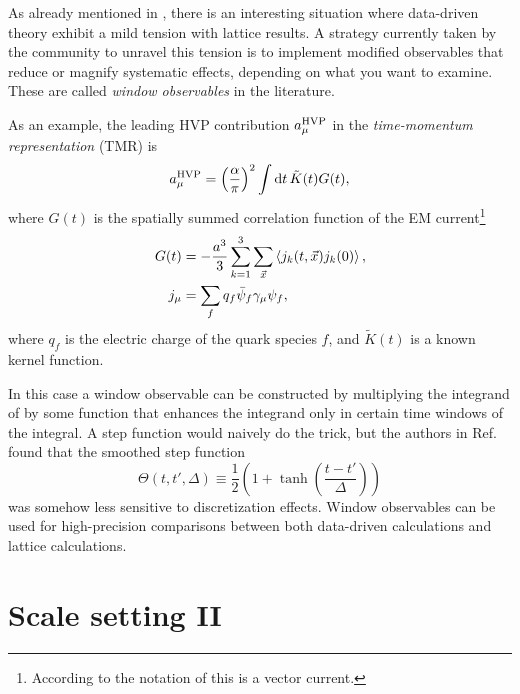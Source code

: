As already mentioned in , there is an interesting situation
where data-driven theory exhibit a mild tension with lattice results.
A strategy currently taken by the community to unravel this tension is to
implement modified observables that reduce or magnify systematic effects,
depending on what you want to examine. These are called {\it window observables}
in the literature.

As an example, the leading HVP contribution $a_\mu^{\rm HVP}$ in the
{\it time-momentum representation} (TMR) is~\cite{bernecker_vector_2011}
\begin{equation}\label{eq:amuhvp}
  a_\mu^{\rm HVP}=\left(\frac{\alpha}{\pi}\right)^2\int\dd{t}\tilde{K}(t)G(t),
\end{equation}
where $G(t)$ is the spatially summed correlation function of the EM 
current\footnote{According to the notation of 
this is a vector current.}
\begin{equation}\begin{aligned}
  G(t) &=-\frac{a^3}{3}\sum_{k=1}^3\sum_{\vec{x}}\ev{j_k(t,\vec{x})j_k(0)},\\
  j_\mu&=\sum_fq_f\bar{\psi}_f\gamma_\mu\psi_f,
\end{aligned}\end{equation}
where $q_f$ is the electric charge of the quark species $f$,
and $\tilde{K}(t)$ is a known kernel function.

In this case a window observable
can be constructed by multiplying the integrand of  by some
function that enhances the integrand only in certain time windows of the
integral. A step function would naively do the trick, but the authors
in Ref.~\cite{blum_calculation_2018} found that the smoothed step function
\begin{equation}
  \Theta(t,t',\Delta)\equiv\frac{1}{2}\left(1+\tanh\left(\frac{t-t'}{\Delta}\right)\right)
\end{equation}
was somehow less sensitive to discretization effects.
Window observables can be used for high-precision comparisons between both
data-driven calculations and lattice calculations.

\section{Scale setting II}\label{sec:refscalesII}



